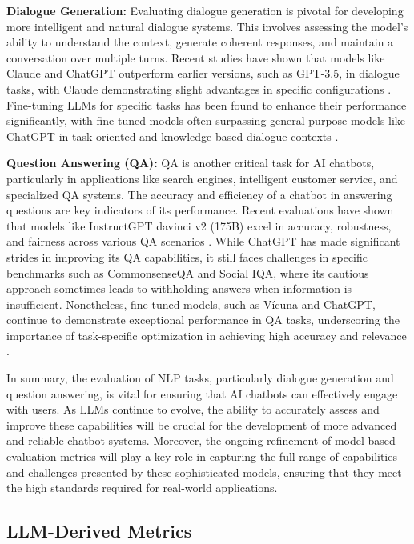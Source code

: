 \textbf{Dialogue Generation:} Evaluating dialogue generation is pivotal for developing more intelligent and natural dialogue systems. This involves assessing the model's ability to understand the context, generate coherent responses, and maintain a conversation over multiple turns. Recent studies have shown that models like Claude and ChatGPT outperform earlier versions, such as GPT-3.5, in dialogue tasks, with Claude demonstrating slight advantages in specific configurations \cite{lin2023llm, qin2023chatgpt}. Fine-tuning LLMs for specific tasks has been found to enhance their performance significantly, with fine-tuned models often surpassing general-purpose models like ChatGPT in task-oriented and knowledge-based dialogue contexts \cite{bang2023multitask}.

\textbf{Question Answering (QA):} QA is another critical task for AI chatbots, particularly in applications like search engines, intelligent customer service, and specialized QA systems. The accuracy and efficiency of a chatbot in answering questions are key indicators of its performance. Recent evaluations have shown that models like InstructGPT davinci v2 (175B) excel in accuracy, robustness, and fairness across various QA scenarios \cite{ouyang2022training, liang2022holistic}. While ChatGPT has made significant strides in improving its QA capabilities, it still faces challenges in specific benchmarks such as CommonsenseQA and Social IQA, where its cautious approach sometimes leads to withholding answers when information is insufficient. Nonetheless, fine-tuned models, such as Vícuna and ChatGPT, continue to demonstrate exceptional performance in QA tasks, underscoring the importance of task-specific optimization in achieving high accuracy and relevance \cite{bai2024benchmarking}.

In summary, the evaluation of NLP tasks, particularly dialogue generation and question answering, is vital for ensuring that AI chatbots can effectively engage with users. As LLMs continue to evolve, the ability to accurately assess and improve these capabilities will be crucial for the development of more advanced and reliable chatbot systems. Moreover, the ongoing refinement of model-based evaluation metrics will play a key role in capturing the full range of capabilities and challenges presented by these sophisticated models, ensuring that they meet the high standards required for real-world applications.

\subsection{LLM-Derived Metrics}

